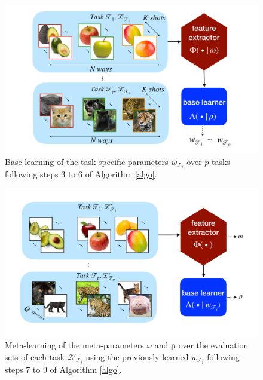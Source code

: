 \begin{figure}[htbp]
  \centering
  \includegraphics[width=1\columnwidth]{BT.pdf}
  \vspace{-3mm}
  \caption{Base-learning of the task-specific parameters $w_{\mathcal{T}_i}$ over $p$ tasks following steps 3 to 6 of Algorithm \ref{algo}.}
  \label{fig:base}
\end{figure}
\begin{figure}[htbp]
  \centering
  \includegraphics[width=1\columnwidth]{MT.pdf}
  \vspace{-3mm}
  \caption{Meta-learning of the meta-parameters $\omega$ and $\bm{\rho}$ over the evaluation sets of each task $\mathcal{Z}'_{\mathcal{T}_i}$ using the previously learned $w_{\mathcal{T}_i}$ following steps 7 to 9 of Algorithm \ref{algo}.}
  \label{fig:meta}
\end{figure}

